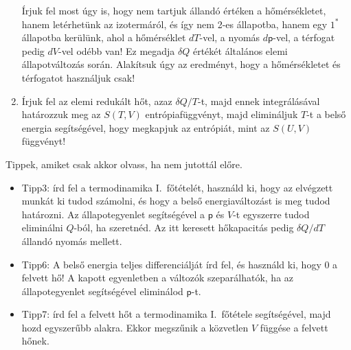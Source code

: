 \documentclass[12pt,a4paper]{scrartcl}
\newcommand{\pres}{\mathsf p}	%
\begin{document}
\begin{enumerate}
Írjuk fel most úgy is, hogy nem tartjuk állandó értéken a hőmérsékletet, hanem letérhetünk az izotermáról, és így nem 2-es állapotba, hanem egy $1^*$ állapotba kerülünk, ahol a hőmérséklet $dT$-vel, a nyomás $d\pres$-vel, a térfogat pedig $dV$-vel odébb van! Ez megadja $\delta Q$ értékét általános elemi állapotváltozás során. Alakítsuk úgy az eredményt, hogy  a hőmérsékletet és térfogatot használjuk csak!
\item Írjuk fel az elemi redukált hőt, azaz $\delta Q /T$-t, majd ennek integrálásával határozzuk meg az $S\left( {T,V} \right)$ entrópiafüggvényt, majd elimináljuk $T$-t a belső energia segítségével, hogy megkapjuk az entrópiát, mint az $S\left( {U,V} \right)$ függvényt! %
\end{enumerate}
\footnotesize Tippek, amiket csak akkor olvass, ha nem jutottál előre.
\begin{itemize}
\item Tipp3: írd fel a termodinamika I.\ főtételét, használd ki, hogy az elvégzett munkát ki tudod számolni, és hogy a belső energiaváltozást is meg tudod határozni. Az állapotegyenlet segítségével a $\pres$ és $V$-t egyszerre tudod eliminálni $Q$-ból, ha szeretnéd. Az itt keresett hőkapacitás pedig $\delta Q/dT$ állandó nyomás mellett.
\item Tipp6: A belső energia teljes differenciálját írd fel, és használd ki, hogy 0 a felvett hő! A kapott egyenletben a változók szeparálhatók, ha az állapotegyenlet segítségével eliminálod $\pres$-t.
\item Tipp7: írd fel a felvett hőt a termodinamika I.\ főtétele segítségével, majd hozd egyszerűbb alakra. Ekkor megszűnik a közvetlen $V$ függése a felvett hőnek.
\end{itemize}
 \normalsize 
\end{document}

